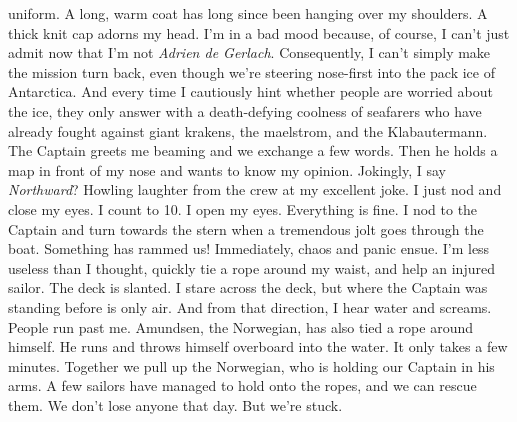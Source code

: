 \documentclass{article}
\begin{document}
  uniform.
  A long, warm coat has long since been hanging over my shoulders. A thick knit cap adorns my head. I'm in a bad
  mood because, of course, I can't just admit now that I'm not \textit{Adrien de Gerlach}. Consequently, I can't
  simply make the mission turn back, even though we're steering nose-first into the pack ice of Antarctica. And
  every time I cautiously hint whether people are worried about the ice, they only answer with a death-defying
  coolness of seafarers who have already fought against giant krakens, the maelstrom, and the Klabautermann. The
  Captain greets me beaming and we exchange a few words. Then he holds a map in front of my nose and wants to know
  my opinion. Jokingly, I say \textit{Northward}? Howling laughter from the crew at my excellent joke. I just nod
  and
  close my eyes. I count to 10. I open my eyes. Everything is fine. I nod to the Captain and turn towards the
  stern
  when a tremendous jolt goes through the boat. Something has rammed us! Immediately, chaos and panic ensue. I'm
  less useless than I thought, quickly tie a rope around my waist, and help an injured sailor. The deck is
  slanted.
  I stare across the deck, but where the Captain was standing before is only air. And from that direction, I hear
  water and screams. People run past me. Amundsen, the Norwegian, has also tied a rope around himself. He runs and
  throws himself overboard into the water. It only takes a few minutes. Together we pull up the Norwegian, who is
  holding our Captain in his arms. A few sailors have managed to hold onto the ropes, and we can rescue them. We
  don't lose anyone that day. But we're stuck.\\
\end{document}
